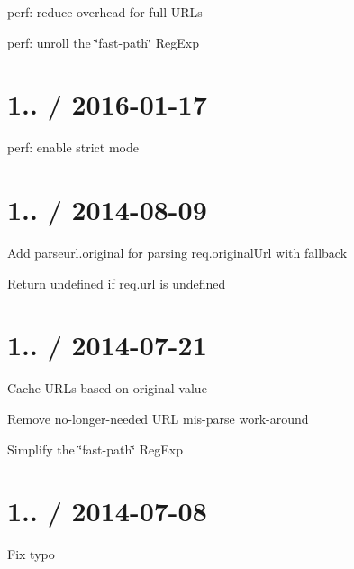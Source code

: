 
\begin{DoxyItemize}
\item perf\+: reduce overhead for full U\+R\+Ls
\item perf\+: unroll the \char`\"{}fast-\/path\char`\"{} {\ttfamily Reg\+Exp}
\end{DoxyItemize}

\section*{1.. / 2016-\/01-\/17 }


\begin{DoxyItemize}
\item perf\+: enable strict mode
\end{DoxyItemize}

\section*{1.. / 2014-\/08-\/09 }


\begin{DoxyItemize}
\item Add {\ttfamily parseurl.\+original} for parsing {\ttfamily req.\+original\+Url} with fallback
\item Return {\ttfamily undefined} if {\ttfamily req.\+url} is {\ttfamily undefined}
\end{DoxyItemize}

\section*{1.. / 2014-\/07-\/21 }


\begin{DoxyItemize}
\item Cache U\+R\+Ls based on original value
\item Remove no-\/longer-\/needed U\+RL mis-\/parse work-\/around
\item Simplify the \char`\"{}fast-\/path\char`\"{} {\ttfamily Reg\+Exp}
\end{DoxyItemize}

\section*{1.. / 2014-\/07-\/08 }


\begin{DoxyItemize}
\item Fix typo
\end{DoxyItemize}

